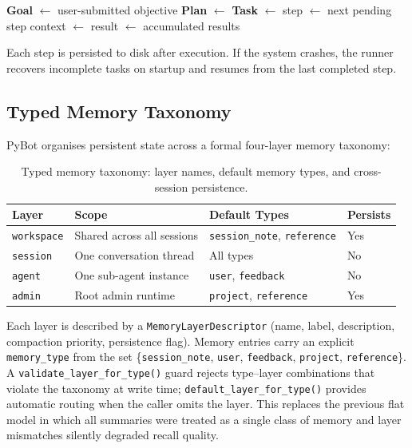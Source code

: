 \documentclass[11pt,a4paper]{article}
\begin{document}
\begin{algorithm}[h]
\caption{Admin Task Lifecycle}
\begin{algorithmic}[1]
\State \textbf{Goal} $\gets$ user-submitted objective
\State \textbf{Plan} $\gets$ 
\State \textbf{Task} $\gets$ 
  \State step $\gets$ next pending step
  \State context $\gets$ 
  \State result $\gets$ 
  \State {}
    \State {}
  \EndIf
\EndWhile
\State \Return accumulated results
\end{algorithmic}
\end{algorithm}

Each step is persisted to disk after execution.
If the system crashes, the runner recovers incomplete tasks on startup and resumes from the last completed step.

\subsection{Typed Memory Taxonomy}
\label{sec:memory-taxonomy}

PyBot organises persistent state across a formal four-layer memory taxonomy:

\begin{table}[h]
\centering
\small
\begin{tabularx}{\textwidth}{llXl}
\toprule
\textbf{Layer} & \textbf{Scope} & \textbf{Default Types} & \textbf{Persists} \\
\midrule
\texttt{workspace} & Shared across all sessions & \texttt{session\_note}, \texttt{reference} & Yes \\
\texttt{session} & One conversation thread & All types & No \\
\texttt{agent} & One sub-agent instance & \texttt{user}, \texttt{feedback} & No \\
\texttt{admin} & Root admin runtime & \texttt{project}, \texttt{reference} & Yes \\
\bottomrule
\end{tabularx}
\caption{Typed memory taxonomy: layer names, default memory types, and cross-session persistence.}
\label{tab:memory-taxonomy}
\end{table}

Each layer is described by a \texttt{MemoryLayerDescriptor} (name, label, description, compaction priority, persistence flag).
Memory entries carry an explicit \texttt{memory\_type} from the set \{\texttt{session\_note}, \texttt{user}, \texttt{feedback}, \texttt{project}, \texttt{reference}\}.
A \texttt{validate\_layer\_for\_type()} guard rejects type--layer combinations that violate the taxonomy at write time; \texttt{default\_layer\_for\_type()} provides automatic routing when the caller omits the layer.
This replaces the previous flat model in which all summaries were treated as a single class of memory and layer mismatches silently degraded recall quality.
\end{document}
